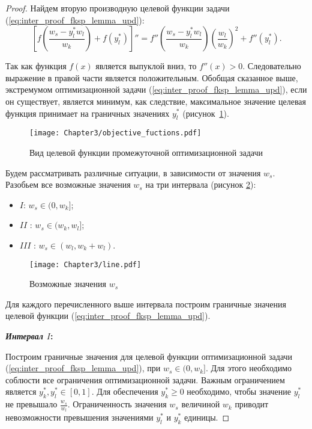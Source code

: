 \begin{proof}
Найдем вторую производную целевой функции задачи (\ref{eq:inter_proof_fksp_lemma_upd}):
$$\left[f\left(\frac{w_s - y_l^{*} w_l}{w_k}\right) + f(y_l^{*})\right]'' = f''\left(\frac{w_s - y_l^{*} w_l}{w_k}\right) \left(\frac{w_l}{w_k}\right)^2 + f''(y_l^{*}).$$

Так как функция $f(x)$ является выпуклой вниз, то $f''(x) > 0$. Следовательно выражение в правой части является положительным. Обобщая сказанное выше, экстремумом оптимизационной задачи (\ref{eq:inter_proof_fksp_lemma_upd}), если он существует, является минимум, как следствие, максимальное значение целевая функция принимает на граничных значениях $y_l^{*}$ (рисунок~\ref{fig:ObjectiveFunctions}).

\begin{figure}[htbp]
\begin{center}
\texttt{[image: Chapter3/objective\_fuctions.pdf]}
\caption{Вид целевой функции промежуточной оптимизационной задачи}
\label{fig:ObjectiveFunctions}
\end{center}
\end{figure}

Будем рассматривать различные ситуации, в зависимости от значения $w_s$. Разобьем все возможные значения $w_s$ на три интервала (рисунок \ref{fig:line}):
\begin{itemize}
	\item $I$: $w_s \in (0, w_k]$;
	\item $II$ : $w_s \in (w_k, w_l]$;
	\item $III$ : $w_s \in (w_l, w_k+w_l)$.
\end{itemize}

\begin{figure}[htbp]
\begin{center}
\texttt{[image: Chapter3/line.pdf]}
\caption{Возможные значения $w_s$}
\label{fig:line}
\end{center}
\end{figure}

Для каждого перечисленного выше интервала построим граничные значения целевой функции (\ref{eq:inter_proof_fksp_lemma_upd}).

\textbf{\textit{Интервал $I$}:}

Построим граничные значения для целевой функции оптимизационной задачи (\ref{eq:inter_proof_fksp_lemma_upd}), при $w_s \in (0, w_k]$. Для этого необходимо соблюсти все ограничения оптимизационной задачи. Важным ограничением является $y_k^{*},y_l^{*} \in [0,1]$. Для обеспечения $y_k^{*} \geq 0$ необходимо, чтобы значение $y_l^{*}$ не превышало $\frac{w_s}{w_l}$. Ограниченность значения $w_s$ величиной $w_k$ приводит невозможности превышения значениями $y_l^{*}$ и $y_k^{*}$ единицы.


\end{proof}
